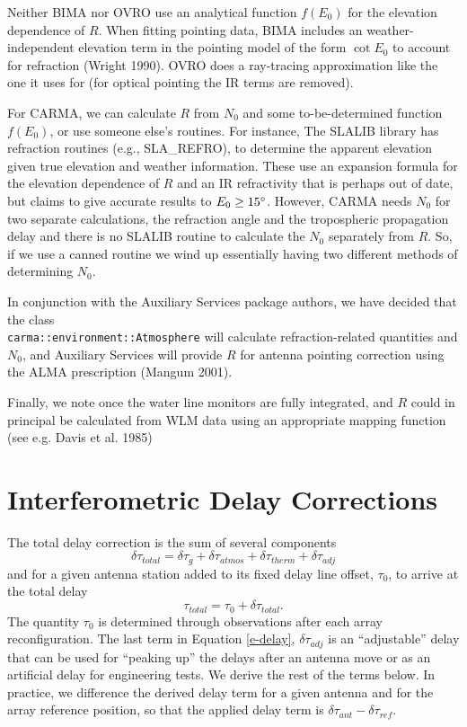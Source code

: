 \documentclass[preprint]{aastex}
\newcommand{\scrL}{ %
   \ifmmode{{\mathscr L}}
   \else{${\mathscr L}$\/}
   \fi}
\def\degree{\ifmmode{^\circ} \else{$^\circ$}\fi}
\begin{document}
Neither BIMA nor OVRO use an analytical function $f(E_0)$ for the elevation
dependence of $R$.  When fitting pointing data, BIMA includes an
weather-independent elevation term in the pointing model of the form
$\cot E_0$ to account for refraction (Wright 1990).  OVRO does a ray-tracing
approximation like the one it uses for \scrL (for optical pointing 
the IR terms are removed).

For CARMA, we can calculate $R$ from $N_0$ and some to-be-determined
function $f(E_0)$, or use someone else's routines.  For instance,
The SLALIB library has refraction routines (e.g., SLA\_REFRO), to
determine the apparent elevation given true elevation and weather
information.  These use an expansion formula for the elevation
dependence of $R$ and an IR refractivity that is perhaps out of
date, but claims to give accurate results to $E_0 \ge 15\degree$.
However, CARMA needs $N_0$ for two separate calculations, the
refraction angle and the tropospheric propagation delay and there
is no SLALIB routine to calculate the $N_0$ separately from $R$.
So, if we use a canned routine we wind up essentially having two
different methods of determining $N_0$.

In conjunction with the Auxiliary Services package authors,
we have decided that the class \\
{\tt carma::environment::Atmosphere} will calculate
refraction-related quantities \scrL and $N_0$, and Auxiliary Services
will provide $R$ for antenna pointing correction using the ALMA
prescription (Mangum 2001).

Finally, we note once the water line monitors are fully integrated,
\scrL and $R$ could in principal be calculated from WLM data using
an appropriate mapping function (see e.g. Davis et al. 1985)

\section{Interferometric Delay Corrections\label{s-delay}}
The total delay correction is the sum of several components 
\begin{equation}
\delta\tau_{total} = \delta\tau_g + \delta\tau_{atmos} + \delta\tau_{therm} 
+ \delta\tau_{adj}
\label{e-delay}
\end{equation}
\noindent and for a given antenna station added to its fixed delay 
line offset, $\tau_0$, to arrive at the total delay
\begin{equation}
\tau_{total} = \tau_0 + \delta\tau_{total}. 
\label{e-totaldelay}
\end{equation}
\noindent The quantity $\tau_0$ is determined through observations after
each array reconfiguration.  The last term in Equation \ref{e-delay},
$\delta\tau_{adj}$ is an ``adjustable'' delay that can be used for
``peaking up'' the delays after an antenna move or as an artificial delay
for engineering tests.  We derive the rest of the terms below.
In practice, we difference the derived delay term
for a given antenna and for the array reference position, so that
the applied delay term is $\delta\tau_{ant} - \delta\tau_{ref}$.
\end{document}

